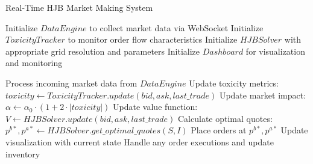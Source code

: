 \documentclass[onecolumn,ieee]{arithmaxresearch}
\begin{document}
\begin{onecolumn}
\begin{algorithm}
\caption{Real-Time HJB Market Making System}
\begin{algorithmic}[1]
\State Initialize $DataEngine$ to collect market data via WebSocket
\State Initialize $ToxicityTracker$ to monitor order flow characteristics
\State Initialize $HJBSolver$ with appropriate grid resolution and parameters
\State Initialize $Dashboard$ for visualization and monitoring

    \State Process incoming market data from $DataEngine$
    \State Update toxicity metrics: $toxicity \gets ToxicityTracker.update(bid, ask, last\_trade)$
    \State Update market impact: $\alpha \gets \alpha_0 \cdot (1 + 2 \cdot |toxicity|)$
    \State Update value function: $V \gets HJBSolver.update(bid, ask, last\_trade)$
    \State Calculate optimal quotes: $p^{b*}, p^{a*} \gets HJBSolver.get\_optimal\_quotes(S, I)$
    \State Place orders at $p^{b*}, p^{a*}$
    \State Update visualization with current state
    \State Handle any order executions and update inventory
\EndWhile
\end{algorithmic}
\end{algorithm}



\end{onecolumn}
\end{document}

